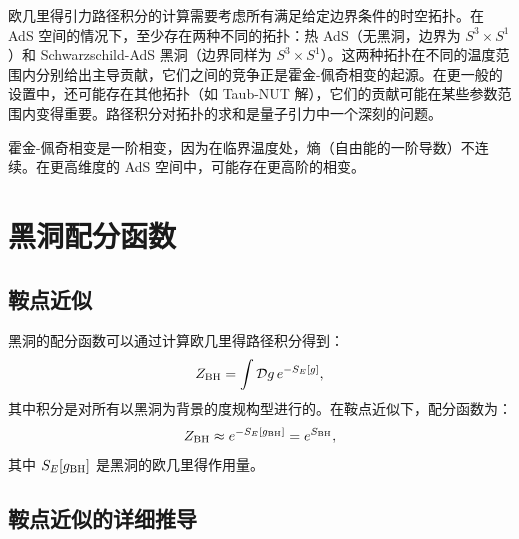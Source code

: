 \begin{remark}[欧几里得路径积分与时空拓扑]
欧几里得引力路径积分的计算需要考虑所有满足给定边界条件的时空拓扑。在 AdS 空间的情况下，至少存在两种不同的拓扑：热 AdS（无黑洞，边界为 $S^3 \times S^1$）和 Schwarzschild-AdS 黑洞（边界同样为 $S^3 \times S^1$）。这两种拓扑在不同的温度范围内分别给出主导贡献，它们之间的竞争正是霍金-佩奇相变的起源。在更一般的设置中，还可能存在其他拓扑（如 Taub-NUT 解），它们的贡献可能在某些参数范围内变得重要。路径积分对拓扑的求和是量子引力中一个深刻的问题\cite{Hawking1983}。
\end{remark}

\begin{remark}[相变的阶数]
霍金-佩奇相变是一阶相变，因为在临界温度处，熵（自由能的一阶导数）不连续。在更高维度的 AdS 空间中，可能存在更高阶的相变。
\end{remark}

\section{黑洞配分函数}

\subsection{鞍点近似}

黑洞的配分函数可以通过计算欧几里得路径积分得到：
\begin{equation}
    Z_{\rm BH} = \int \mathcal{D}g \, e^{-S_E[g]},
\end{equation}
其中积分是对所有以黑洞为背景的度规构型进行的。在鞍点近似下，配分函数为：
\begin{equation}
    Z_{\rm BH} \approx e^{-S_E[g_{\rm BH}]} = e^{S_{\rm BH}},
\end{equation}
其中 $S_E[g_{\rm BH}]$ 是黑洞的欧几里得作用量。

\subsection{鞍点近似的详细推导}

